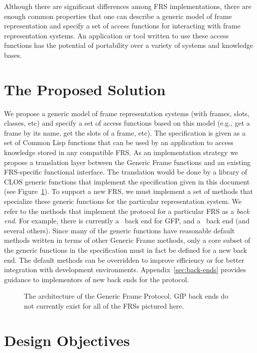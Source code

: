 Although there are significant differences among FRS implementations,
there are enough common properties that one can describe a generic
model of frame representation and specify a set of access functions
for interacting with frame representation systems.  An application or
tool written to use these access functions has the potential of
portability over a variety of systems and knowledge bases.

\section{The Proposed Solution}

We propose a generic model of frame representation systems (with
frames, slots, classes, etc) and specify a set of access functions
based on this model (e.g., get a frame by its name, get the slots of a
frame, etc).  The specification is given as a set of Common Lisp
functions that can be used by an application to access knowledge
stored in any compatible FRS.  As an implementation strategy we
propose a translation layer between the Generic Frame functions
and an existing FRS-specific functional interface.  The translation
would be done by a library of CLOS generic functions that implement
the specification given in this document (see Figure~\ref{fig:clos}).
To support a new FRS, we must implement a set of methods that
specialize these generic functions for the particular representation
system.  We refer to the methods that implement the protocol for a
particular FRS as a {\em back end}.  For example, there is currently a \Loom\
back end for GFP, and a \Theo\ back end (and several others).
Since many of the generic functions have reasonable default
methods written in terms of other Generic Frame methods, only a core
subset of the generic functions in the specification must in fact be
defined for a new back end.  The default methods can be overridden
to improve efficiency or for better integration with development
environments.  Appendix~\ref{sec:back-ends} provides guidance to
implementors of new back ends for the protocol.

\begin{figure}
\centerline{}
\caption{The architecture of the Generic Frame Protocol.  GfP back ends
do not currently exist for all of the FRSs pictured here.}
\label{fig:clos}
\end{figure}  

\section{Design Objectives}

